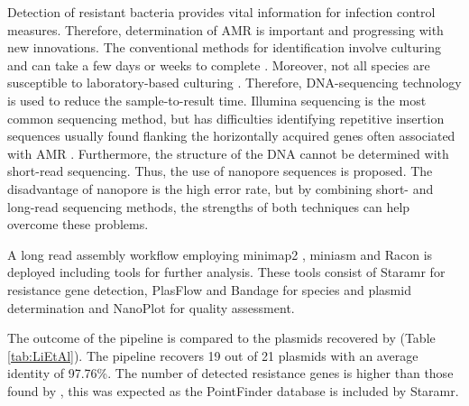 \documentclass[a4paper,num-refs]{oup-contemporary}
\begin{document}
Detection of resistant bacteria provides vital information for infection control measures. Therefore, determination of AMR is important and progressing with new innovations. The conventional methods for identification involve culturing and can take a few days or weeks to complete \cite{Quick2015}. Moreover, not all species are susceptible to laboratory-based culturing \cite{Mitsuhashi2017}. Therefore, DNA-sequencing technology is used to reduce the sample-to-result time. Illumina sequencing is the most common sequencing method, but has difficulties identifying repetitive insertion sequences usually found flanking the horizontally acquired genes often associated with AMR \cite{Ashton2014}. Furthermore, the structure of the DNA cannot be determined with short-read sequencing. Thus, the use of nanopore sequences is proposed. The disadvantage of nanopore is the high error rate, but by combining short- and long-read sequencing methods, the strengths of both techniques can help overcome these problems.

A long read assembly workflow employing minimap2 \cite{Li2018a}, miniasm \cite{Li2016} and Racon \cite{Vaser2017} is deployed including tools for further analysis. These tools consist of Staramr \cite{} for resistance gene detection, PlasFlow \cite{Krawczyk2018} and Bandage \cite{Wick2015} for species and plasmid determination and NanoPlot \cite{DeCoster2018} for quality assessment.

The outcome of the pipeline is compared to the plasmids recovered by \citet{Li2018} (Table \ref{tab:LiEtAl}). The pipeline recovers 19 out of 21 plasmids with an average identity of 97.76\%. The number of detected resistance genes is higher than those found by \citet{Li2018}, this was expected as the PointFinder database is included by Staramr.
\end{document}
